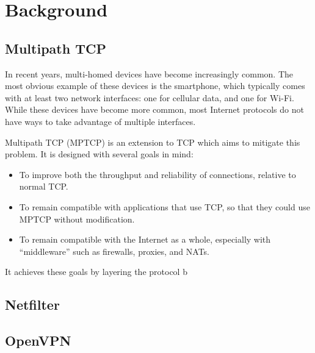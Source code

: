 \section{Background}

\subsection{Multipath TCP}

In recent years, multi-homed devices have become increasingly common. The most
obvious example of these devices is the smartphone, which typically comes with
at least two network interfaces: one for cellular data, and one for Wi-Fi. While
these devices have become more common, most Internet protocols do not have ways
to take advantage of multiple interfaces.

Multipath TCP (MPTCP) is an extension to TCP which aims to mitigate this
problem. It is designed with several goals in mind:

\begin{itemize}
  \item To improve both the throughput and reliability of connections, relative
    to normal TCP.
  \item To remain compatible with applications that use TCP, so that they could
    use MPTCP without modification.
  \item To remain compatible with the Internet as a whole, especially with
    ``middleware'' such as firewalls, proxies, and NATs.
\end{itemize}

It achieves these goals by layering the protocol b

\subsection{Netfilter}

\subsection{OpenVPN}

